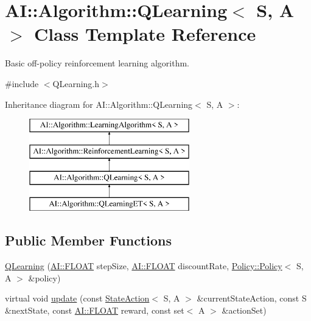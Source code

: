 \hypertarget{classAI_1_1Algorithm_1_1QLearning}{\section{A\+I\+:\+:Algorithm\+:\+:Q\+Learning$<$ S, A $>$ Class Template Reference}
\label{classAI_1_1Algorithm_1_1QLearning}
}


Basic off-\/policy reinforcement learning algorithm.  




{\ttfamily \#include $<$Q\+Learning.\+h$>$}

Inheritance diagram for A\+I\+:\+:Algorithm\+:\+:Q\+Learning$<$ S, A $>$\+:\begin{figure}[H]
\begin{center}
\leavevmode
\includegraphics[height=4.000000cm]{classAI_1_1Algorithm_1_1QLearning}
\end{center}
\end{figure}
\subsection*{Public Member Functions}
\begin{DoxyCompactItemize}
\item 
\hyperlink{classAI_1_1Algorithm_1_1QLearning_a182fd44ac6cd6b2474615ce7b98667ce}{Q\+Learning} (\hyperlink{namespaceAI_a41b74884a20833db653dded3918e05c3}{A\+I\+::\+F\+L\+O\+A\+T} step\+Size, \hyperlink{namespaceAI_a41b74884a20833db653dded3918e05c3}{A\+I\+::\+F\+L\+O\+A\+T} discount\+Rate, \hyperlink{classAI_1_1Algorithm_1_1Policy_1_1Policy}{Policy\+::\+Policy}$<$ S, A $>$ \&policy)
\item 
virtual void \hyperlink{classAI_1_1Algorithm_1_1QLearning_a042e1987ce21a94f59603c4cb1eeed82}{update} (const \hyperlink{classAI_1_1StateAction}{State\+Action}$<$ S, A $>$ \&current\+State\+Action, const S \&next\+State, const \hyperlink{namespaceAI_a41b74884a20833db653dded3918e05c3}{A\+I\+::\+F\+L\+O\+A\+T} reward, const set$<$ A $>$ \&action\+Set)
\end{DoxyCompactItemize}
